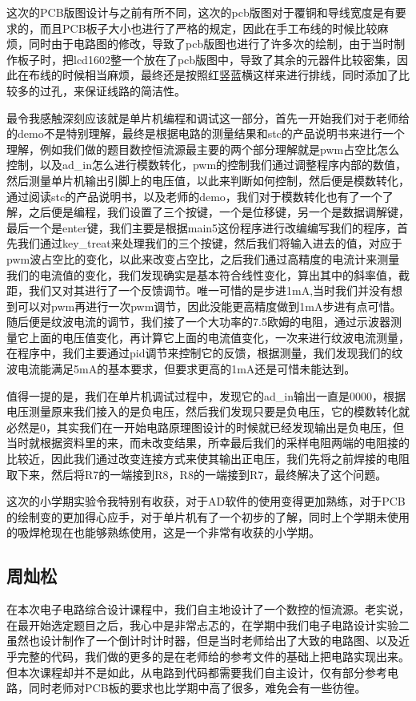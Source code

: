 \documentclass{zjureport}
\begin{document}
        这次的PCB版图设计与之前有所不同，这次的pcb版图对于覆铜和导线宽度是有要求的，而且PCB板子大小也进行了严格的规定，因此在手工布线的时候比较麻烦，同时由于电路图的修改，导致了pcb版图也进行了许多次的绘制，由于当时制作板子时，把lcd1602整一个放在了pcb版图中，导致了其余的元器件比较密集，因此在布线的时候相当麻烦，最终还是按照红竖蓝横这样来进行排线，同时添加了比较多的过孔，来保证线路的简洁性。

        最令我感触深刻应该就是单片机编程和调试这一部分，首先一开始我们对于老师给的demo不是特别理解，最终是根据电路的测量结果和stc的产品说明书来进行一个理解，例如我们做的题目数控恒流源最主要的两个部分理解就是pwm占空比怎么控制，以及ad_in怎么进行模数转化，pwm的控制我们通过调整程序内部的数值，然后测量单片机输出引脚上的电压值，以此来判断如何控制，然后便是模数转化，通过阅读stc的产品说明书，以及老师的demo，我们对于模数转化也有了一个了解，之后便是编程，我们设置了三个按键，一个是位移键，另一个是数据调解键，最后一个是enter键，我们主要是根据main5这份程序进行改编编写我们的程序，首先我们通过key_treat来处理我们的三个按键，然后我们将输入进去的值，对应于pwm波占空比的变化，以此来改变占空比，之后我们通过高精度的电流计来测量我们的电流值的变化，我们发现确实是基本符合线性变化，算出其中的斜率值，截距，我们又对其进行了一个反馈调节。唯一可惜的是步进1mA,当时我们并没有想到可以对pwm再进行一次pwm调节，因此没能更高精度做到1mA步进有点可惜。随后便是纹波电流的调节，我们接了一个大功率的7.5欧姆的电阻，通过示波器测量它上面的电压值变化，再计算它上面的电流值变化，一次来进行纹波电流测量，在程序中，我们主要通过pid调节来控制它的反馈，根据测量，我们发现我们的纹波电流能满足5mA的基本要求，但要求更高的1mA还是可惜未能达到。

        值得一提的是，我们在单片机调试过程中，发现它的ad_in输出一直是0000，根据电压测量原来我们接入的是负电压，然后我们发现只要是负电压，它的模数转化就必然是0，其实我们在一开始电路原理图设计的时候就已经发现输出是负电压，但当时就根据资料里的来，而未改变结果，所幸最后我们的采样电阻两端的电阻接的比较近，因此我们通过改变连接方式来使其输出正电压，我们先将之前焊接的电阻取下来，然后将R7的一端接到R8，R8的一端接到R7，最终解决了这个问题。

        这次的小学期实验令我特别有收获，对于AD软件的使用变得更加熟练，对于PCB的绘制变的更加得心应手，对于单片机有了一个初步的了解，同时上个学期未使用的吸焊枪现在也能够熟练使用，这是一个非常有收获的小学期。
        \newpage
        
        \subsection{周灿松}
        在本次电子电路综合设计课程中，我们自主地设计了一个数控的恒流源。老实说，在最开始选定题目之后，我心中是非常忐忑的，在学期中我们电子电路设计实验二虽然也设计制作了一个倒计时计时器，但是当时老师给出了大致的电路图、以及近乎完整的代码，我们做的更多的是在老师给的参考文件的基础上把电路实现出来。但本次课程却并不是如此，从电路到代码都需要我们自主设计，仅有部分参考电路，同时老师对PCB板的要求也比学期中高了很多，难免会有一些彷徨。
\end{document}
